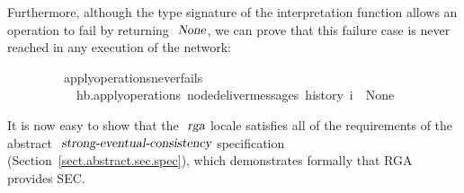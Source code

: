 \vspace{0.275em}
Furthermore, although the type signature of the interpretation function allows an operation to fail by returning $\isa{None}$, we can prove that this failure case is never reached in any execution of the network:
\vspace{0.275em}
\begin{isabellebody}
\ \ \ \ \ \ \ \ \ apply{\isacharunderscore}operations{\isacharunderscore}never{\isacharunderscore}fails{\isacharcolon}\isanewline
\ \ \ \ \ \ \ \ \ \ \ {\isachardoublequoteopen}hb.apply{\isacharunderscore}operations\ {\isacharparenleft}node{\isacharunderscore}deliver{\isacharunderscore}messages\ {\isacharparenleft}history\ i{\isacharparenright}{\isacharparenright}\ {\isasymnoteq}\ None{\isachardoublequoteclose}
\end{isabellebody}
\vspace{0.275em}
It is now easy to show that the $\isa{rga}$ locale satisfies all of the requirements of the abstract $\isa{strong-eventual-consistency}$ specification (Section~\ref{sect.abstract.sec.spec}), which demonstrates formally that RGA provides SEC.
